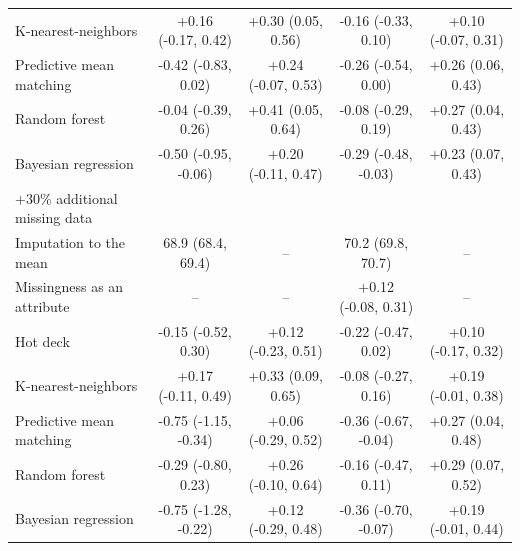 \documentclass{article}
\begin{document}
\begin{table}
\begin{tabular}{lcccc}
K-nearest-neighbors & +0.16 (-0.17, 0.42) & +0.30 (0.05, 0.56) & -0.16 (-0.33, 0.10) & +0.10 (-0.07, 0.31) \\ 
Predictive mean matching & -0.42 (-0.83, 0.02) & +0.24 (-0.07, 0.53) & -0.26 (-0.54, 0.00) & +0.26 (0.06, 0.43) \\ 
Random forest & -0.04 (-0.39, 0.26) & +0.41 (0.05, 0.64) & -0.08 (-0.29, 0.19) & +0.27 (0.04, 0.43) \\ 
Bayesian regression & -0.50 (-0.95, -0.06) & +0.20 (-0.11, 0.47) & -0.29 (-0.48, -0.03) & +0.23 (0.07, 0.43) \\ 
\midrule
\multicolumn{1}{l}{+30\% additional missing data} \\ 
\midrule
Imputation to the mean & 68.9 (68.4, 69.4) & -- & 70.2 (69.8, 70.7) & -- \\ 
Missingness as an attribute & -- & -- & +0.12 (-0.08, 0.31) & -- \\ 
Hot deck & -0.15 (-0.52, 0.30) & +0.12 (-0.23, 0.51) & -0.22 (-0.47, 0.02) & +0.10 (-0.17, 0.32) \\ 
K-nearest-neighbors & +0.17 (-0.11, 0.49) & +0.33 (0.09, 0.65) & -0.08 (-0.27, 0.16) & +0.19 (-0.01, 0.38) \\ 
Predictive mean matching & -0.75 (-1.15, -0.34) & +0.06 (-0.29, 0.52) & -0.36 (-0.67, -0.04) & +0.27 (0.04, 0.48) \\ 
Random forest & -0.29 (-0.80, 0.23) & +0.26 (-0.10, 0.64) & -0.16 (-0.47, 0.11) & +0.29 (0.07, 0.52) \\ 
Bayesian regression & -0.75 (-1.28, -0.22) & +0.12 (-0.29, 0.48) & -0.36 (-0.70, -0.07) & +0.19 (-0.01, 0.44) \\ 
\bottomrule
\end{tabular} 
 \end{table}

\clearpage
\end{document}
